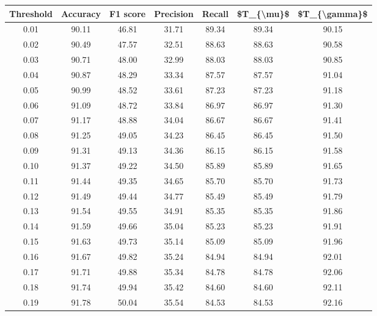 \begin{tabular}{|c|c|c|c|c|c|c|}
\hline
 Threshold &  Accuracy &  F1 score &  Precision &  Recall &  \$T\_\{\textbackslash mu\}\$ &  \$T\_\{\textbackslash gamma\}\$ \\
\hline
      0.01 &     90.11 &     46.81 &      31.71 &   89.34 &      89.34 &         90.15 \\
      0.02 &     90.49 &     47.57 &      32.51 &   88.63 &      88.63 &         90.58 \\
      0.03 &     90.71 &     48.00 &      32.99 &   88.03 &      88.03 &         90.85 \\
      0.04 &     90.87 &     48.29 &      33.34 &   87.57 &      87.57 &         91.04 \\
      0.05 &     90.99 &     48.52 &      33.61 &   87.23 &      87.23 &         91.18 \\
      0.06 &     91.09 &     48.72 &      33.84 &   86.97 &      86.97 &         91.30 \\
      0.07 &     91.17 &     48.88 &      34.04 &   86.67 &      86.67 &         91.41 \\
      0.08 &     91.25 &     49.05 &      34.23 &   86.45 &      86.45 &         91.50 \\
      0.09 &     91.31 &     49.13 &      34.36 &   86.15 &      86.15 &         91.58 \\
      0.10 &     91.37 &     49.22 &      34.50 &   85.89 &      85.89 &         91.65 \\
      0.11 &     91.44 &     49.35 &      34.65 &   85.70 &      85.70 &         91.73 \\
      0.12 &     91.49 &     49.44 &      34.77 &   85.49 &      85.49 &         91.79 \\
      0.13 &     91.54 &     49.55 &      34.91 &   85.35 &      85.35 &         91.86 \\
      0.14 &     91.59 &     49.66 &      35.04 &   85.23 &      85.23 &         91.91 \\
      0.15 &     91.63 &     49.73 &      35.14 &   85.09 &      85.09 &         91.96 \\
      0.16 &     91.67 &     49.82 &      35.24 &   84.94 &      84.94 &         92.01 \\
      0.17 &     91.71 &     49.88 &      35.34 &   84.78 &      84.78 &         92.06 \\
      0.18 &     91.74 &     49.94 &      35.42 &   84.60 &      84.60 &         92.11 \\
      0.19 &     91.78 &     50.04 &      35.54 &   84.53 &      84.53 &         92.16 \\

\end{tabular}

